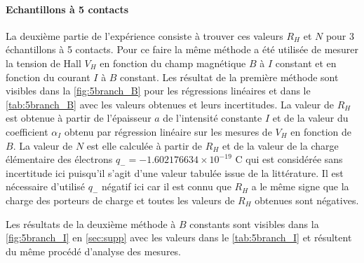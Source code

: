 \paragraph*{Echantillons à 5 contacts}

La deuxième partie de l'expérience consiste à trouver ces valeurs \(R_H\) et \(N\) pour 3 échantillons à 5 contacts. Pour ce faire la même méthode a été utilisée de mesurer la tension de Hall \(V_H\) en fonction du champ magnétique \(B\) à \(I\) constant et en fonction du courant \(I\) à \(B\) constant. Les résultat de la première méthode sont visibles dans la \autoref{fig:5branch_B} pour les régressions linéaires et dans le \autoref{tab:5branch_B} avec les valeurs obtenues et leurs incertitudes. La valeur de \(R_H\) est obtenue à partir de l'épaisseur \(a\) de l'intensité constante \(I\) et de la valeur du coefficient \(\alpha_I\) obtenu par régression linéaire sur les mesures de \(V_H\) en fonction de \(B\). La valeur de \(N\) est elle calculée à partir de \(R_H\) et de la valeur de la charge élémentaire des électrons \(q_- = -1.602176634\times10^{-19}\) \si{\coulomb} qui est considérée sans incertitude ici puisqu'il s'agit d'une valeur tabulée issue de la littérature. Il est nécessaire d'utilisé \(q_-\) négatif ici car il est connu que \(R_H\) a le même signe que la charge des porteurs de charge et toutes les valeurs de \(R_H\) obtenues sont négatives.

Les résultats de la deuxième méthode à \(B\) constants sont visibles dans la \autoref{fig:5branch_I} en \autoref{sec:supp} avec les valeurs dans le \autoref{tab:5branch_I} et résultent du même procédé d'analyse des mesures.

